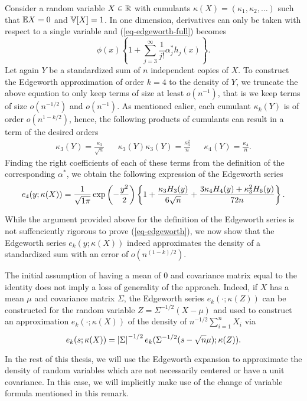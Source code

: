 \begin{example} \label{ex-edgeworth-1d}
    Consider a random variable $X \in \mathbb{R}$ with cumulants $\kappa(X) = (\kappa_1, \kappa_2, \ldots)$ such that $\mathbb{E}{X} = 0$ and $\mathbb{V}[X] = 1$. In one dimension, derivatives can only be taken with respect to a single variable and (\ref{eq-edgeworth-full}) becomes
    \begin{equation*}
        \phi(x) \left\{
            1 + \sum_{j=3}^\infty  \frac{1}{j!}\alpha^*_j h_j(x)
        \right\}.
    \end{equation*}
    Let again $Y$ be a standardized sum of $n$ independent copies of $X$. To construct the Edgeworth approximation of order $k = 4$ to the density of $Y$, we truncate the above equation to only keep terms of size at least $o(n^{-1})$, that is we keep terms of size $o(n^{-1/2})$ and $o(n^{-1})$. As mentioned ealier, each cumulant $\kappa_k(Y)$ is of order $o(n^{1-k/2})$, hence, the following products of cumulants can result in a term of the desired orders
    \begin{align*}
        \kappa_3(Y) = \frac{\kappa_3}{\sqrt{n}} && \kappa_3(Y)\kappa_3(Y) = \frac{\kappa_3^2}{n} && \kappa_4(Y) = \frac{\kappa_4}{n}.
    \end{align*}
    Finding the right coefficients of each of these terms from the definition of the corresponding $\alpha^*$, we obtain the following expression of the Edgeworth series
    \begin{equation} \label{eq-edgeworth-1d-4}
        e_4(y; \kappa(X)) = \frac{1}{\sqrt{1\pi}}\exp\left(-\frac{y^2}{2}\right)\left\{1 + \frac{\kappa_3 H_3(y)}{6\sqrt{n}} + \frac{3\kappa_4 H_4(y) + \kappa_3^2 H_6(y)}{72 n}\right\}.
    \end{equation}
\end{example}

While the argument provided above for the definition of the Edgeworth series is not suffenciently rigorous to prove (\ref{eq-edgeworth}), we now show that the Edgeworth series $e_k(y; \kappa(X))$ indeed approximates the density of a standardized sum with an error of $o(n^{(1-k)/2})$.

\begin{remark} \label{rem-centering}
    The initial assumption of having a mean of 0 and covariance matrix equal to the identity does not imply a loss of generality of the approach. Indeed, if $X$ has a mean $\mu$ and covariance matrix $\Sigma$, the Edgeworth series $e_k(\cdot; \kappa(Z))$ can be constructed for the random variable $Z = \Sigma^{-1/2}(X - \mu)$ and used to construct an approximation $e_k(\cdot; \kappa(X))$ of the density of $n^{-1/2} \sum_{i=1}^n X_i$ via
    \begin{equation*}
        e_k(s; \kappa(X)) = \left|\Sigma\right|^{-1/2} e_k(\Sigma^{-1/2}(s - \sqrt{n}\mu); \kappa(Z)).
    \end{equation*}

    In the rest of this thesis, we will use the Edgeworth expansion to approximate the density of random variables which are not necessarily centered or have a unit covariance. In this case, we will implicitly make use of the change of variable formula mentioned in this remark. 
\end{remark}


